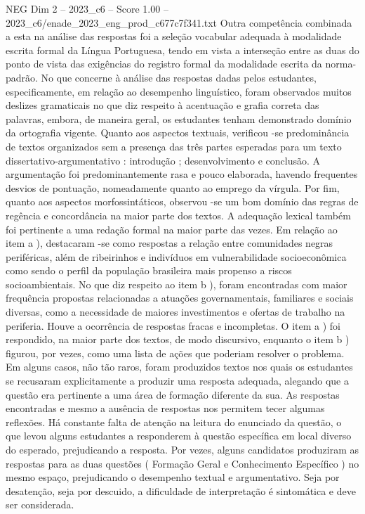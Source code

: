 \begin{textsample}{NEG Dim 2 – 2023\_c6 – Score 1.00 – 2023\_c6/enade\_2023\_eng\_prod\_c677c7f341.txt}
Outra competência combinada a esta na análise das respostas foi a seleção vocabular adequada à modalidade escrita formal da Língua Portuguesa, tendo em vista a interseção entre as duas do ponto de vista das exigências do registro formal da modalidade escrita da norma-padrão.
No que concerne à análise das respostas dadas pelos estudantes, especificamente, em relação ao desempenho linguístico, foram observados muitos deslizes gramaticais no que diz respeito à acentuação e grafia correta das palavras, embora, de maneira geral, os estudantes tenham demonstrado domínio da ortografia vigente.
Quanto aos aspectos textuais, verificou -se predominância de textos organizados sem a presença das três partes esperadas para um texto dissertativo-argumentativo : introdução ; desenvolvimento e conclusão.
A argumentação foi predominantemente rasa e pouco elaborada, havendo frequentes desvios de pontuação, nomeadamente quanto ao emprego da vírgula.
Por fim, quanto aos aspectos morfossintáticos, observou -se um bom domínio das regras de regência e concordância na maior parte dos textos.
A adequação lexical também foi pertinente a uma redação formal na maior parte das vezes.
Em relação ao item a ), destacaram -se como respostas a relação entre comunidades negras periféricas, além de ribeirinhos e indivíduos em vulnerabilidade socioeconômica como sendo o perfil da população brasileira mais propenso a riscos socioambientais.
No que diz respeito ao item b ), foram encontradas com maior frequência propostas relacionadas a atuações governamentais, familiares e sociais diversas, como a necessidade de maiores investimentos e ofertas de trabalho na periferia.
Houve a ocorrência de respostas fracas e incompletas.
O item a ) foi respondido, na maior parte dos textos, de modo discursivo, enquanto o item b ) figurou, por vezes, como uma lista de ações que poderiam resolver o problema.
Em alguns casos, não tão raros, foram produzidos textos nos quais os estudantes se recusaram explicitamente a produzir uma resposta adequada, alegando que a questão era pertinente a uma área de formação diferente da sua.
As respostas encontradas e mesmo a ausência de respostas nos permitem tecer algumas reflexões.
Há constante falta de atenção na leitura do enunciado da questão, o que levou alguns estudantes a responderem à questão específica em local diverso do esperado, prejudicando a resposta.
Por vezes, alguns candidatos produziram as respostas para as duas questões ( Formação Geral e Conhecimento Específico ) no mesmo espaço, prejudicando o desempenho textual e argumentativo.
Seja por desatenção, seja por descuido, a dificuldade de interpretação é sintomática e deve ser considerada.

\end{textsample}
